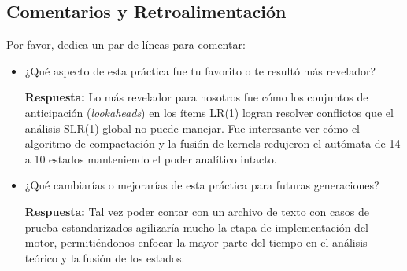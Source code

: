 \documentclass[12pt, letterpaper]{article}
\begin{document}
\subsection*{Comentarios y Retroalimentación}
\noindent Por favor, dedica un par de líneas para comentar:
\begin{itemize}
    \item ¿Qué aspecto de esta práctica fue tu favorito o te resultó más revelador?
    
    \textbf{Respuesta:} Lo más revelador para nosotros fue cómo los conjuntos de anticipación (\textit{lookaheads}) en los ítems LR(1) logran resolver conflictos que el análisis SLR(1) global no puede manejar. Fue interesante ver cómo el algoritmo de compactación y la fusión de kernels redujeron el autómata de 14 a 10 estados manteniendo el poder analítico intacto.

    \item ¿Qué cambiarías o mejorarías de esta práctica para futuras generaciones?
    
    \textbf{Respuesta:} Tal vez poder contar con un archivo de texto con casos de prueba estandarizados agilizaría mucho la etapa de implementación del motor, permitiéndonos enfocar la mayor parte del tiempo en el análisis teórico y la fusión de los estados.
    
\end{itemize}
\end{document}
